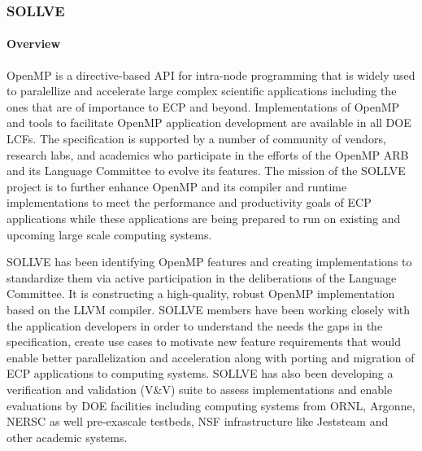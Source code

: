 \subsubsection{SOLLVE}\label{subsubsect:sollve}


\paragraph{Overview}
OpenMP is a directive-based API for intra-node programming that is widely used  to paralellize and accelerate large complex scientific applications including the ones that are of importance to ECP and beyond. Implementations of OpenMP and  tools to facilitate OpenMP application development are available in all DOE LCFs. The specification is supported by a number of community of vendors, research labs, and academics who participate in the efforts of the OpenMP ARB and its Language Committee to evolve its features. The mission of the SOLLVE project is to further enhance OpenMP and its compiler and runtime implementations to meet the performance and productivity goals of ECP applications while these applications are being prepared to run on existing and upcoming large scale computing systems. 

SOLLVE has been identifying OpenMP features and creating implementations to standardize them via active participation in the deliberations of the Language Committee. It is constructing a high-quality, robust OpenMP implementation based on the LLVM compiler. SOLLVE members have been working closely with the application developers in order to understand the needs the gaps in the specification, create use cases to motivate new feature requirements that would enable better parallelization and acceleration along with porting and migration of ECP applications to computing systems. SOLLVE has also been developing a verification and validation (V\&V) suite to assess implementations and enable evaluations by DOE facilities including computing systems from ORNL, Argonne, NERSC as well pre-exascale testbeds, NSF infrastructure like Jeststeam and other academic systems. 

